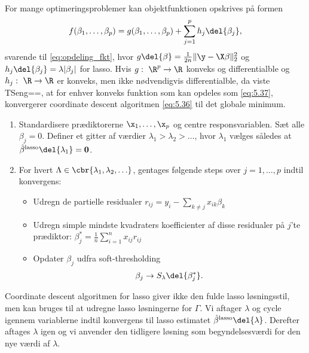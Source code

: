 For mange optimeringsproblemer kan objektfunktionen opskrives på formen
\begin{align}
f(\beta_1, \dots, \beta_p) = g(\beta_1, \dots, \beta_p) + \sum_{j = 1}^p h_j \del{\beta_j}, \label{eq:5.37}
\end{align}
svarende til \eqref{eq:opdeling_fkt}, hvor \(g \del{\beta} = \frac{1}{2n} \Vert \y - \X \beta \Vert_2^2\) og \(h_j \del{\beta_j} = \lambda \vert \beta_j \vert\) for lasso.
Hvis \(g: \ \R^p \rightarrow \R\) konveks og differentialble og $h_j: \ \R \rightarrow \R$ er konveks, men ikke nødvendigvis differentialble, da viste TSeng==, at for enhver konveks funktion som kan opdeles som \eqref{eq:5.37}, konvergerer coordinate descent algoritmen \eqref{eq:5.36} til det globale minimum. 
%
\begin{alg} 
\begin{enumerate}
%
\item Standardisere prædiktorerne \(\x_1, \ldots, \x_p\) og centre responsvariablen.
Sæt alle \(\beta_j = 0\).
Definer et gitter af værdier \(\lambda_1 > \lambda_2 > \ldots\), hvor \(\lambda_1\) vælges således at \(\hat{\beta}^\text{lasso} \del{\lambda_1} =\mathbf{0}\).
\item For hvert \(\Lambda \in \cbr{\lambda_1, \lambda_2, \ldots}\), gentages følgende steps over \(j = 1, \ldots, p\) indtil konvergens:
\begin{itemize}
\item Udregn de partielle residualer \(r_{ij} = y_i - \sum_{k \neq j} x_{ik} \beta_k\)
\item Udregn simple mindste kvadraters koefficienter af disse residualer på \(j\)'te prædiktor: \(\beta_j^* = \frac{1}{n} \sum_{i=1}^n x_{ij} r_{ij}\) 
\item Opdater \(\beta_j\) udfra soft-thresholding
\begin{align*}
\beta_j \rightarrow S_\lambda \del{\beta_j^*}.
\end{align*}
\end{itemize}
\end{enumerate}
\end{alg}
Coordinate descent algoritmen for lasso giver ikke den fulde lasso løsningsstil, men kan bruges til at udregne lasso løsningerne for \(\Gamma\).
Vi aftager \(\lambda\) og cycle igennem variablerne indtil konvergens til lasso estimatet \(\hat{\beta}^\text{lasso} \del{\lambda}\).
Derefter aftages \(\lambda\) igen og vi anvender den tidligere løsning som begyndelsesværdi for den nye værdi af \(\lambda\).
\newpage